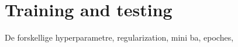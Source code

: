 \graphicspath{{Chapters/Project/}}

\section{Training and testing} %
\label{sec:training_and_testing}

De forskellige hyperparametre, regularization, mini ba, epoches, 

